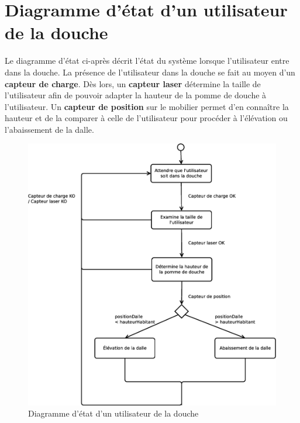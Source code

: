 \section{Diagramme d'état d'un utilisateur de la douche}
Le diagramme d'état ci-après décrit l'état du système lorsque l'utilisateur entre dans la douche. 
%
La présence de l'utilisateur dans la douche se fait au moyen d'un \textbf{capteur de charge}. Dès lors, un \textbf{capteur laser} détermine la taille de l'utilisateur afin de pouvoir adapter la hauteur de la pomme de douche à l'utilisateur. Un \textbf{capteur de position} sur le mobilier permet d'en connaître la hauteur et de la comparer à celle de l'utilisateur pour procéder à l'élévation ou l'abaissement de la dalle. 
\begin{figure}[H]
	\centering
	\includegraphics[width=1\linewidth]{diagrams/bathroom/diagramme_etat_st2.eps}
	\caption{Diagramme d'état d'un utilisateur de la douche}
	\label{fig:diagramme_st2}
\end{figure}
